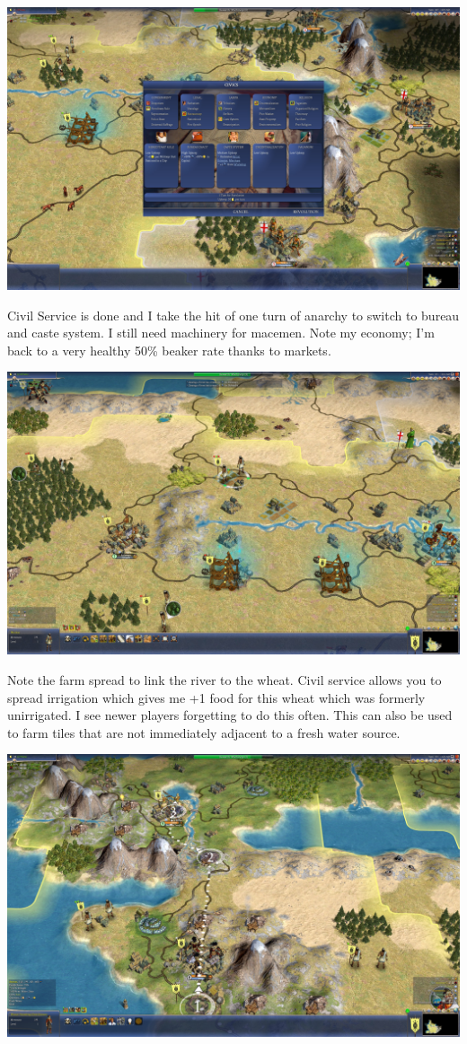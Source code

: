 \documentclass[10pt]{article}
\begin{document}
\includegraphics[width=1.0\textwidth]{122}

Civil Service is done and I take the hit of one turn of anarchy to switch to bureau and caste system. I still need
machinery for macemen. Note my economy; I'm back to a very healthy 50\% beaker rate thanks to markets.

\includegraphics[width=1.0\textwidth]{124}

Note the farm spread to link the river to the wheat. Civil service allows you to spread irrigation which gives me
+1 food for this wheat which was formerly unirrigated. I see newer players forgetting to do this often. This can
also be used to farm tiles that are not immediately adjacent to a fresh water source.

\includegraphics[width=1.0\textwidth]{125}
\end{document}
